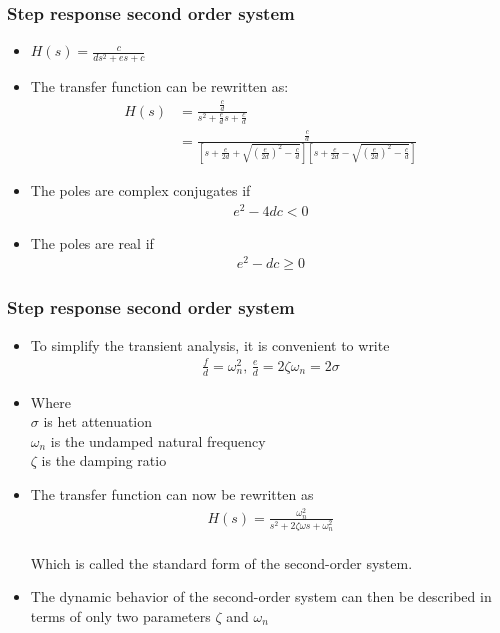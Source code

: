 \begin{frame}
\frametitle{Step response second order system}
\begin{itemize}
\item $H(s) = \frac{c}{ds^2+es+c}$
\vspace{0.45cm}
\item The transfer function can be rewritten as:
\\ 
\begin{align*}
H(s) &= \frac{\frac{c}{d}}{s^2+\frac{e}{d}s+\frac{c}{d}}
\\ &= \frac{\frac{c}{d}}{[s+\frac{e}{2d}+\sqrt{(\frac{e}{2d})^2-\frac{c}{d}}][s+\frac{e}{2d}-\sqrt{(\frac{e}{2d})^2-\frac{c}{d}}]}
\end{align*}
\item The poles are complex conjugates if
\\ \vspace{-0.15cm}
\begin{align*}
e^2 -4dc <0
\end{align*}
\item The poles are real if
\\
\begin{align*}
e^2 -dc\ge 0
\end{align*}
\end{itemize}
\end{frame}

\begin{frame}
\frametitle{Step response second order system}
\begin{itemize}
\item To simplify the transient analysis, it is convenient to write
\\ 
\begin{align*}
\frac{f}{d} = \omega_n ^2\text{, } \frac{e}{d}=2\zeta\omega_n=2\sigma
\end{align*}
\item Where 
\\ $\sigma$ is het attenuation 
\\$\omega_n$ is the undamped natural frequency 
\\ $\zeta$ is the damping ratio
\vspace{0.25cm}
\item The transfer function can now be rewritten as
\\ \vspace{-0.5cm}
\begin{align*}
H(s) = \frac{\omega_n ^2}{s^2+2\zeta\omega s +\omega_n ^2}
\end{align*}
\\ Which is called the standard form of the second-order system.
\vspace{0.25cm}
\item The dynamic behavior of the second-order system can then be described in terms of only two parameters $\zeta$ and $\omega_n$
\end{itemize} 
\end{frame}

